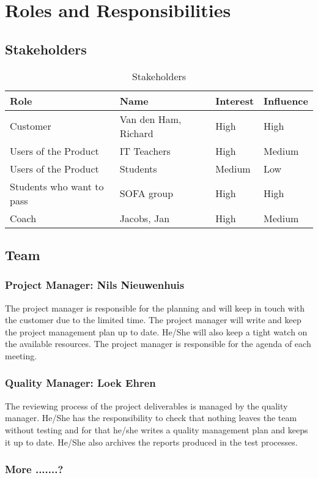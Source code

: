 \section{Roles and Responsibilities}

\subsection{Stakeholders}
\begin{table}[h]
    \begin{tabular}{l|l|l|l}
        \textbf{Role}               &   \textbf{Name}           &   \textbf{Interest}     &     \textbf{Influence}  \\ \hline \hline
        Customer                    &   Van den Ham, Richard    &   High                  &     High                \\ \hline
        Users of the Product        &   IT Teachers             &   High                  &     Medium              \\ \hline
        Users of the Product        &   Students                &   Medium                &     Low                 \\ \hline
        Students who want to pass   &   SOFA group              &   High                  &     High                \\ \hline
        Coach                       &   Jacobs, Jan             &   High                  &     Medium              \\ \hline        
    \end{tabular}
    \caption{Stakeholders}
\end{table}

\subsection{Team}
    \subsubsection{Project Manager: Nils Nieuwenhuis}
    The project manager is responsible for the planning
    and will keep in touch with the customer due to the limited time. The project manager will write and
    keep the project management plan up to date. He/She will also keep a tight watch on the available
    resources. The project manager is responsible for the agenda of each meeting.

    \subsubsection{Quality Manager: Loek Ehren}
    The reviewing process of the project deliverables is managed by the quality manager. He/She has the responsibility to check that nothing leaves
    the team without testing and for that he/she writes a quality management plan and keeps it up to date. He/She also archives the reports produced
    in the test processes. 

    \subsubsection{More .......?}
